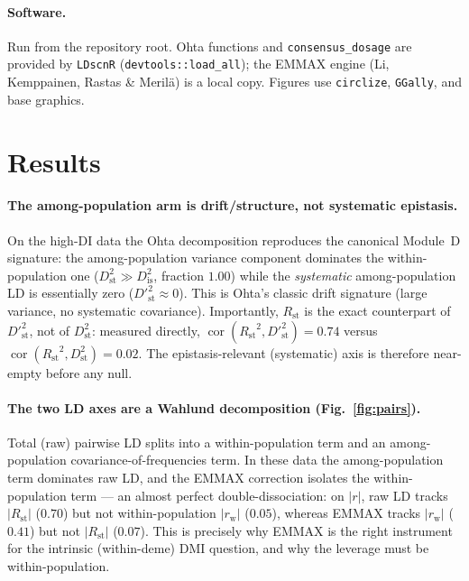 \documentclass[11pt]{article}
\newcommand{\Rst}{\ensuremath{R_{\mathrm{st}}}}
\newcommand{\Dst}{\ensuremath{D^{2}_{\mathrm{st}}}}
\newcommand{\Dis}{\ensuremath{D^{2}_{\mathrm{is}}}}
\newcommand{\Dpst}{\ensuremath{D'^{2}_{\mathrm{st}}}}
\newcommand{\wpr}{\ensuremath{r_{\mathrm{w}}}}
\begin{document}
\paragraph{Software.}
Run from the repository root. Ohta functions and \texttt{consensus\_dosage} are provided by \texttt{LDscnR}
(\texttt{devtools::load\_all}); the EMMAX engine (Li, Kemppainen, Rastas \& Meril\"a) is a local copy. Figures use
\texttt{circlize}, \texttt{GGally}, and base graphics.

\section{Results}

\paragraph{The among-population arm is drift/structure, not systematic epistasis.}
On the high-DI data the Ohta decomposition reproduces the canonical Module~D signature: the among-population variance
component dominates the within-population one ($\Dst\gg\Dis$, fraction $1.00$) while the \emph{systematic}
among-population LD is essentially zero ($\Dpst\approx0$). This is Ohta's classic drift signature (large variance,
no systematic covariance). Importantly, $\Rst$ is the exact counterpart of $\Dpst$, not of $\Dst$: measured directly,
$\operatorname{cor}(\Rst^2,\Dpst)=0.74$ versus $\operatorname{cor}(\Rst^2,\Dst)=0.02$. The epistasis-relevant
(systematic) axis is therefore near-empty before any null.

\paragraph{The two LD axes are a Wahlund decomposition (Fig.~\ref{fig:pairs}).}
Total (raw) pairwise LD splits into a within-population term and an among-population covariance-of-frequencies term.
In these data the among-population term dominates raw LD, and the EMMAX correction isolates the within-population
term --- an almost perfect double-dissociation: on $|r|$, raw LD tracks $|\Rst|$ ($0.70$) but not within-population
$|\wpr|$ ($0.05$), whereas EMMAX tracks $|\wpr|$ ($0.41$) but not $|\Rst|$ ($0.07$). This is precisely why EMMAX is the
right instrument for the intrinsic (within-deme) DMI question, and why the leverage must be within-population.
\end{document}
